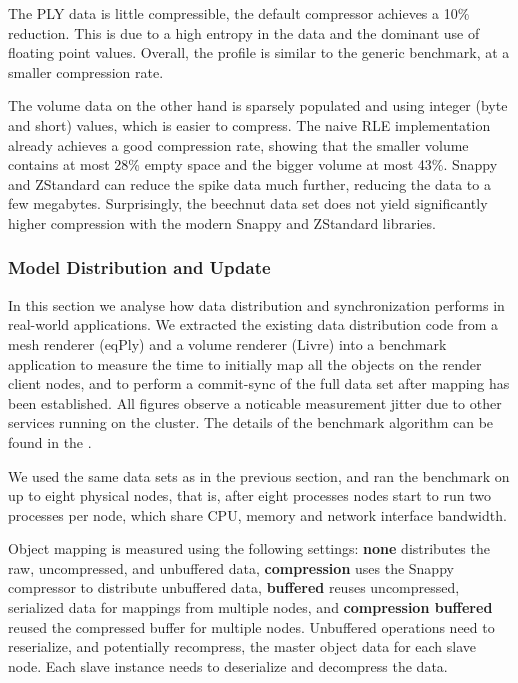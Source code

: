 \documentclass[10pt,journal,compsoc]{IEEEtran}
\begin{document}
The PLY data is little compressible, the default compressor achieves a 10\%
reduction. This is due to a high entropy in the data and the dominant use of
floating point values. Overall, the profile is similar to the generic benchmark,
at a smaller compression rate.

The volume data on the other hand is sparsely populated and using integer (byte
and short) values, which is easier to compress. The naive RLE implementation
already achieves a good compression rate, showing that the smaller volume contains at
most 28\% empty space and the bigger volume at most 43\%. Snappy and ZStandard
can reduce the spike data much further, reducing the data to a few megabytes.
Surprisingly, the beechnut data set does not yield significantly higher
compression with the modern Snappy and ZStandard libraries.


\subsubsection{Model Distribution and Update}

In this section we analyse how data distribution and synchronization performs in
real-world applications. We extracted the existing data distribution code from a
mesh renderer (eqPly) and a volume renderer (Livre) into a benchmark application
to measure the time to initially map all the objects on the render client nodes,
and to perform a commit-sync of the full data set after mapping has been
established. All figures observe a noticable measurement jitter due to other
services running on the cluster. The details of the benchmark algorithm can be
found in the
.

We used the same data sets as in the previous section, and ran the benchmark on up
to eight physical nodes, that is, after eight processes nodes start to run two
processes per node, which share CPU, memory and network interface bandwidth.

Object mapping is measured using the following settings: \textbf{none}
distributes the raw, uncompressed, and unbuffered data, \textbf{compression}
uses the Snappy compressor to distribute unbuffered data, \textbf{buffered}
reuses uncompressed, serialized data for mappings from multiple nodes, and
\textbf{compression buffered} reused the compressed buffer for multiple nodes.
Unbuffered operations need to reserialize, and potentially recompress, the
master object data for each slave node. Each slave instance needs to deserialize
and decompress the data.
\end{document}

